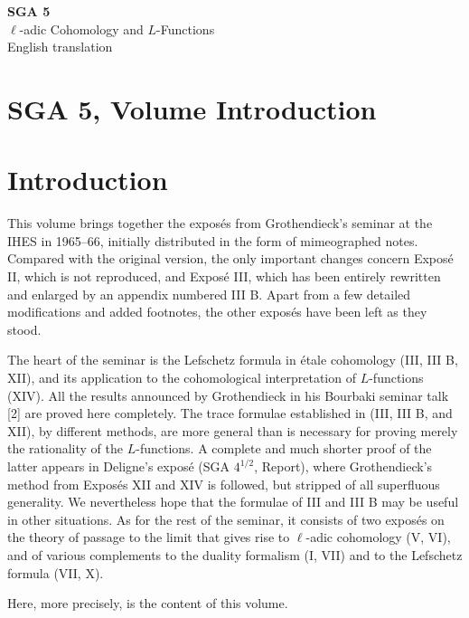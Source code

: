 \documentclass[11pt]{article}
\theoremstyle{plain}
\theoremstyle{definition}
\theoremstyle{remark}
\begin{document}
\begin{titlepage}
\centering
\vspace*{2.3in}
{\LARGE\textbf{SGA 5}}\\[0.5em]
{\Large $\ell$-adic Cohomology and \(L\)-Functions}\\[1.5em]
{\large English translation}
\vfill
\end{titlepage}
\tableofcontents


\clearpage
\section*{SGA 5, Volume Introduction}

\section*{Introduction}

This volume brings together the exposés from Grothendieck's seminar at the IHES in 1965--66, initially distributed in the form of mimeographed notes. Compared with the original version, the only important changes concern Exposé II, which is not reproduced, and Exposé III, which has been entirely rewritten and enlarged by an appendix numbered III B. Apart from a few detailed modifications and added footnotes, the other exposés have been left as they stood.

The heart of the seminar is the Lefschetz formula in étale cohomology (III, III B, XII), and its application to the cohomological interpretation of $L$-functions (XIV). All the results announced by Grothendieck in his Bourbaki seminar talk [2] are proved here completely. The trace formulae established in (III, III B, and XII), by different methods, are more general than is necessary for proving merely the rationality of the $L$-functions. A complete and much shorter proof of the latter appears in Deligne's exposé (SGA $4^{1/2}$, Report), where Grothendieck's method from Exposés XII and XIV is followed, but stripped of all superfluous generality. We nevertheless hope that the formulae of III and III B may be useful in other situations. As for the rest of the seminar, it consists of two exposés on the theory of passage to the limit that gives rise to $\ell$-adic cohomology (V, VI), and of various complements to the duality formalism (I, VII) and to the Lefschetz formula (VII, X).

Here, more precisely, is the content of this volume.
\end{document}
